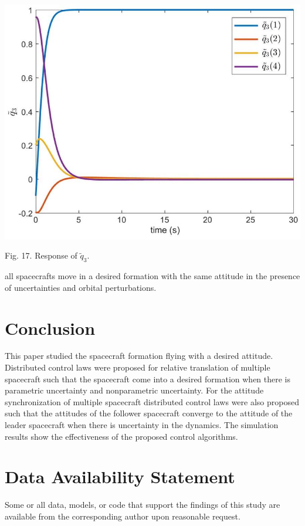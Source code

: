 \documentclass[10pt]{article}
\begin{document}
\begin{center}
\includegraphics[max width=\textwidth]{2023_10_07_a50fd94fd281fe9896c1g-10}
\end{center}

Fig. 17. Response of $\tilde{q}_{3}$.

all spacecrafts move in a desired formation with the same attitude in the presence of uncertainties and orbital perturbations.

\section{Conclusion}
This paper studied the spacecraft formation flying with a desired attitude. Distributed control laws were proposed for relative translation of multiple spacecraft such that the spacecraft come into a desired formation when there is parametric uncertainty and nonparametric uncertainty. For the attitude synchronization of multiple spacecraft distributed control laws were also proposed such that the attitudes of the follower spacecraft converge to the attitude of the leader spacecraft when there is uncertainty in the dynamics. The simulation results show the effectiveness of the proposed control algorithms.

\section{Data Availability Statement}
Some or all data, models, or code that support the findings of this study are available from the corresponding author upon reasonable request.
\end{document}
